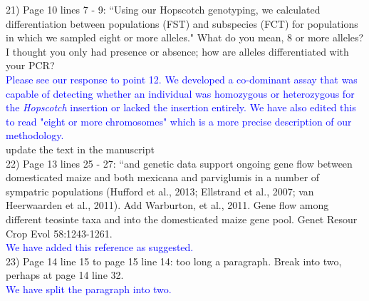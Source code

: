 \documentclass[11pt]{article}
\newcommand{\res}[1]{\noindent \textcolor{blue}{{#1}} \\}
\newcommand{\mbh}[1]{\noindent \textcolor{Dandelion}{{#1}}\\}
\begin{document}
21) Page 10 lines 7 - 9: ``Using our Hopscotch genotyping, we calculated diﬀerentiation between populations (FST) and subspecies (FCT) for populations in which we sampled eight or more alleles." What do you mean, 8 or more alleles? I thought you only had presence or absence; how are alleles differentiated with your PCR?\\ 

\res{Please see our response to point 12.  We developed a co-dominant assay that was capable of detecting whether an individual was homozygous or heterozygous for the \emph{Hopscotch} insertion or lacked the insertion entirely.  We have also edited this to read "eight or more chromosomes" which is a more precise description of our methodology.}
\mbh{update the text in the manuscript}

22) Page 13 lines 25 - 27: ``and genetic data support ongoing gene flow between domesticated maize and both mexicana and parviglumis in a number of sympatric populations (Hufford et al., 2013; Ellstrand et al., 2007; van Heerwaarden et al., 2011). Add Warburton, et al., 2011.  Gene flow among different teosinte taxa and into the domesticated maize gene pool.  Genet Resour Crop Evol 58:1243-1261.\\ 

\res{We have added this reference as suggested.}

23) Page 14 line 15 to page 15 line 14: too long a paragraph. Break into two, perhaps at page 14 line 32.\\ 

\res{We have split the paragraph into two.}


\end{document}
